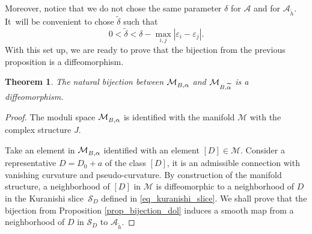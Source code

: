 \documentclass[JEP,XML,SOM,NoEqCountersInSection,Unicode,published]{cedram}
\newcommand{\NoChangel}[1]{%
\expandafter\let\csname old\string#1\endcsname=#1
\let#1=\relax
\newcommand{#1}{\mathcode`l="716C\csname old\string#1\endcsname\mathcode`l="7160 }%
}
\newcommand{\Dol}{\mathrm{Dol}}\NoChangel{\Dol}
\let\epsilon\varepsilon
\theoremstyle{definition}
\theoremstyle{plain}
\newtheorem{theorem}[definition]{Theorem}
\begin{document}
Moreover, notice that we do not chose the same parameter $\delta$ for $\mathcal{A}$ and for $\mathcal{A}_{\widetilde{h}}$. It~will be convenient to chose $\widetilde{\delta}$ such that
\begin{equation}\label{eq_delta_t_small}
0 < \widetilde{\delta} < \delta - \max_{i,j} |\epsilon_i-\epsilon_j|.
\end{equation}
With this set up, we are ready to prove that the bijection from the previous proposition is a diffeomorphism.
\begin{theorem}\label{th_diffeo_var_alpha}
The natural bijection between $\mathcal{M}^{\Dol}_{B,\alpha}$ and $\mathcal{M}^{\Dol}_{B,\widetilde{\alpha}}$ is a diffeomorphism.
\end{theorem}
\begin{proof}
The moduli space $\mathcal{M}^{\Dol}_{B,\alpha}$ is identified with the manifold $\mathcal{M}$ with the complex structure $J$.

Take an element in $\mathcal{M}^{\Dol}_{B,\alpha}$ identified with an element $[D]\in\mathcal{M}$. Consider a representative $D=D_0+a$ of the class $[D]$, it is an admissible connection with vanishing curvature and pseudo-curvature. By construction of the manifold structure, a neighborhood of $[D]$ in $\mathcal{M}$ is diffeomorphic to a neighborhood of $D$ in the Kuranishi slice~$\mathcal{S}_{D}$ defined in \eqref{eq_kuranishi_slice}. We shall prove that the bijection from Proposition \ref{prop_bijection_dol} induces a smooth map from a neighborhood of $D$ in $\mathcal{S}_{D}$ to $\mathcal{A}_{\widetilde{h}}$.


\end{proof}
\end{document}
